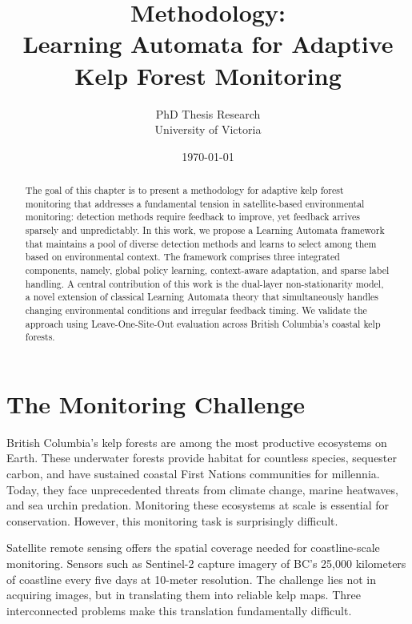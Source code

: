 \documentclass[11pt,a4paper]{article}
\begin{document}
\title{Methodology:\\Learning Automata for Adaptive Kelp Forest Monitoring}
\author{PhD Thesis Research \\ University of Victoria}
\date{\today}
\maketitle

\begin{abstract}
The goal of this chapter is to present a methodology for adaptive kelp forest monitoring that addresses a fundamental tension in satellite-based environmental monitoring: detection methods require feedback to improve, yet feedback arrives sparsely and unpredictably. In this work, we propose a Learning Automata framework that maintains a pool of diverse detection methods and learns to select among them based on environmental context. The framework comprises three integrated components, namely, global policy learning, context-aware adaptation, and sparse label handling. A central contribution of this work is the dual-layer non-stationarity model, a novel extension of classical Learning Automata theory that simultaneously handles changing environmental conditions and irregular feedback timing. We validate the approach using Leave-One-Site-Out evaluation across British Columbia's coastal kelp forests.
\end{abstract}

\tableofcontents
\newpage


\section{The Monitoring Challenge}
\label{sec:challenge}

British Columbia's kelp forests are among the most productive ecosystems on Earth. These underwater forests provide habitat for countless species, sequester carbon, and have sustained coastal First Nations communities for millennia. Today, they face unprecedented threats from climate change, marine heatwaves, and sea urchin predation. Monitoring these ecosystems at scale is essential for conservation. However, this monitoring task is surprisingly difficult.

Satellite remote sensing offers the spatial coverage needed for coastline-scale monitoring. Sensors such as Sentinel-2 capture imagery of BC's 25,000 kilometers of coastline every five days at 10-meter resolution. The challenge lies not in acquiring images, but in translating them into reliable kelp maps. Three interconnected problems make this translation fundamentally difficult.
\end{document}

